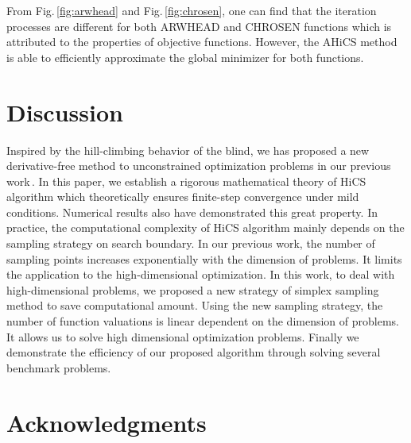 \documentclass[final,1p,times]{elsarticle}
\begin{document}
From Fig.\,\ref{fig:arwhead} and Fig.\,\ref{fig:chrosen}, one can
find that the iteration processes are different for both 
ARWHEAD and CHROSEN functions which is attributed to the
properties of objective functions. However, 
the AHiCS method is able to efficiently approximate the global
minimizer for both functions. 




\section{Discussion}
\label{sec:conclusion}

Inspired by the hill-climbing behavior of the blind, we has
proposed a new derivative-free method to unconstrained
optimization problems in our previous work\,\cite{huang2017hill}. 
In this paper, we establish a rigorous mathematical theory of HiCS
algorithm which theoretically ensures finite-step convergence
under mild conditions. Numerical results also have demonstrated
this great property. 
In practice, the computational complexity of HiCS algorithm mainly
depends on the sampling strategy on search boundary.
In our previous work, the number of sampling points
increases exponentially with the dimension of problems. It limits
the application to the high-dimensional optimization. 
In this work, to deal with high-dimensional problems, 
we proposed a new strategy of simplex
sampling method to save computational amount. Using the new
sampling strategy, the number of function valuations is linear
dependent on the dimension of problems. 
It allows us to solve high dimensional optimization problems. 
Finally we demonstrate the efficiency of our proposed algorithm
through solving several benchmark problems.



\section*{Acknowledgments}


%
%
\end{document}

